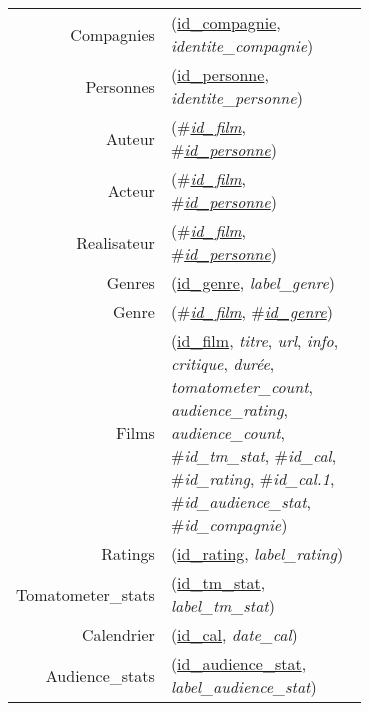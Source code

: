 
\usepackage[normalem]{ulem}
\newenvironment{mld}
  {\par\begin{minipage}{\linewidth}\begin{tabular}{rp{0.7\linewidth}}}
  {\end{tabular}\end{minipage}\par}
\newcommand{\relat}[1]{\textsc{#1}}
\newcommand{\attr}[1]{\emph{#1}}
\newcommand{\prim}[1]{\uline{#1}}
\newcommand{\foreign}[1]{\#\textsl{#1}}


\begin{mld}
  Compagnies & (\prim{id\_compagnie}, \attr{identite\_compagnie})\\
  Personnes & (\prim{id\_personne}, \attr{identite\_personne})\\
  Auteur & (\foreign{\prim{id\_film}}, \foreign{\prim{id\_personne}})\\
  Acteur & (\foreign{\prim{id\_film}}, \foreign{\prim{id\_personne}})\\
  Realisateur & (\foreign{\prim{id\_film}}, \foreign{\prim{id\_personne}})\\
  Genres & (\prim{id\_genre}, \attr{label\_genre})\\
  Genre & (\foreign{\prim{id\_film}}, \foreign{\prim{id\_genre}})\\
  Films & (\prim{id\_film}, \attr{titre}, \attr{url}, \attr{info}, \attr{critique}, \attr{durée}, \attr{tomatometer\_count}, \attr{audience\_rating}, \attr{audience\_count}, \foreign{id\_tm\_stat}, \foreign{id\_cal}, \foreign{id\_rating}, \foreign{id\_cal.1}, \foreign{id\_audience\_stat}, \foreign{id\_compagnie})\\
  Ratings & (\prim{id\_rating}, \attr{label\_rating})\\
  Tomatometer\_stats & (\prim{id\_tm\_stat}, \attr{label\_tm\_stat})\\
  Calendrier & (\prim{id\_cal}, \attr{date\_cal})\\
  Audience\_stats & (\prim{id\_audience\_stat}, \attr{label\_audience\_stat})\\
\end{mld}